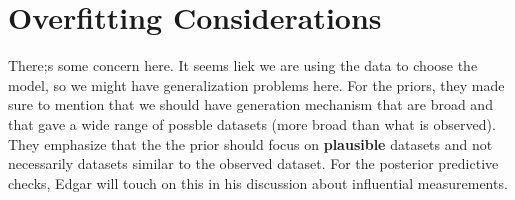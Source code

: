 \documentclass[]{article}
\begin{document}
\section*{Overfitting Considerations}
There;s some concern here. It seems liek we are using the data to choose the model,  so we might have generalization problems here. For the priors, they made sure to mention that we should have generation mechanism that are broad and that gave a wide range of possble datasets (more broad than what is observed). They emphasize that the the prior should focus on \textbf{plausible} datasets and not necessarily datasets similar to the observed dataset. For the posterior predictive checks, Edgar will touch on this in his discussion about influential measurements.
\end{document}
